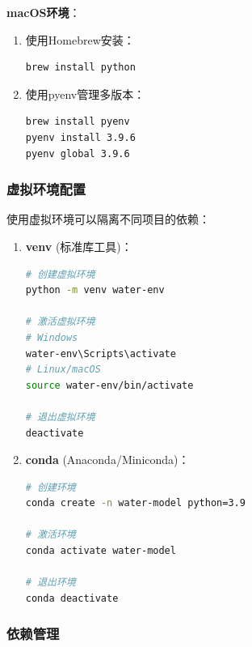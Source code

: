 \textbf{macOS环境}：

\begin{enumerate}
\def\labelenumi{\arabic{enumi}.}
\item
  使用Homebrew安装：

\begin{lstlisting}[language=bash]
brew install python
\end{lstlisting}
\item
  使用pyenv管理多版本：

\begin{lstlisting}[language=bash]
brew install pyenv
pyenv install 3.9.6
pyenv global 3.9.6
\end{lstlisting}
\end{enumerate}

\subsubsection{虚拟环境配置}\label{ux865aux62dfux73afux5883ux914dux7f6e}

使用虚拟环境可以隔离不同项目的依赖：

\begin{enumerate}
\def\labelenumi{\arabic{enumi}.}
\item
  \textbf{venv} (标准库工具)：

\begin{lstlisting}[language=bash]
# 创建虚拟环境
python -m venv water-env

# 激活虚拟环境
# Windows
water-env\Scripts\activate
# Linux/macOS
source water-env/bin/activate

# 退出虚拟环境
deactivate
\end{lstlisting}
\item
  \textbf{conda} (Anaconda/Miniconda)：

\begin{lstlisting}[language=bash]
# 创建环境
conda create -n water-model python=3.9

# 激活环境
conda activate water-model

# 退出环境
conda deactivate
\end{lstlisting}
\end{enumerate}

\subsubsection{依赖管理}\label{ux4f9dux8d56ux7ba1ux7406}

